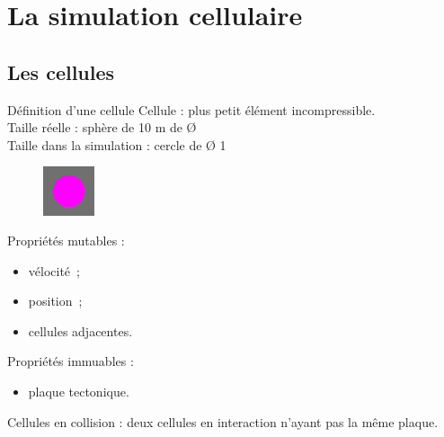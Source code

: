 \documentclass{beamer}
\begin{document}
\section{La simulation cellulaire}

\subsection{Les cellules}
\begin{frame}{Définition d'une cellule}
  Cellule : plus petit élément incompressible.\\
  Taille réelle : sphère de 10 m de Ø\\
  Taille dans la simulation : cercle de Ø 1
  \begin{figure}
    \begin{center}
      \includegraphics[width=1.5cm]{Images/cellule.png}
    \end{center}
  \end{figure}
  Propriétés mutables :
  \begin{itemize}
   \item vélocité~;
   \item position~;
   \item cellules adjacentes.
  \end{itemize}
  Propriétés immuables :
  \begin{itemize}
   \item plaque tectonique.\\
  \end{itemize}
  \smallbreak
  Cellules en collision : deux cellules en interaction n'ayant pas la même plaque.
\end{frame}
\end{document}

